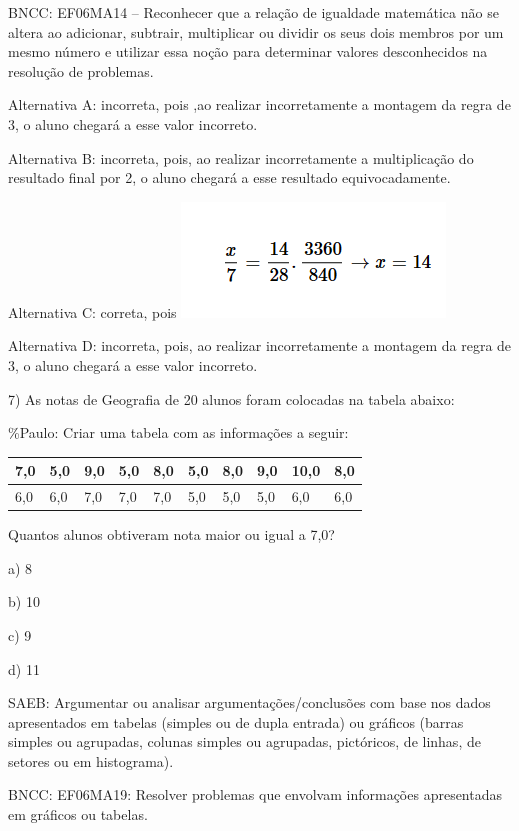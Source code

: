 BNCC: EF06MA14 -- Reconhecer que a relação de igualdade matemática não
se altera ao adicionar, subtrair, multiplicar ou dividir os seus dois
membros por um mesmo número e utilizar essa noção para determinar
valores desconhecidos na resolução de problemas.

Alternativa A: incorreta, pois ,ao realizar incorretamente a montagem da
regra de 3, o aluno chegará a esse valor incorreto.

Alternativa B: incorreta, pois, ao realizar incorretamente a
multiplicação do resultado final por 2, o aluno chegará a esse resultado
equivocadamente.

Alternativa C: correta, pois
\includegraphics[width=2.76042in,height=1.20833in]{./imgSAEB_6_MAT/media/image116.png}

Alternativa D: incorreta, pois, ao realizar incorretamente a montagem da
regra de 3, o aluno chegará a esse valor incorreto.

7) As notas de Geografia de 20 alunos foram colocadas na tabela abaixo:

\%Paulo: Criar uma tabela com as informações a seguir:

\begin{longtable}[]{@{}llllllllll@{}}
\toprule
7,0 & 5,0 & 9,0 & 5,0 & 8,0 & 5,0 & 8,0 & 9,0 & 10,0 &
8,0\tabularnewline
\midrule
\endhead
6,0 & 6,0 & 7,0 & 7,0 & 7,0 & 5,0 & 5,0 & 5,0 & 6,0 & 6,0\tabularnewline
\bottomrule
\end{longtable}

Quantos alunos obtiveram nota maior ou igual a 7,0?

a) 8

b) 10

c) 9

d) 11

SAEB: Argumentar ou analisar argumentações/conclusões com base nos dados
apresentados em tabelas (simples ou de dupla entrada) ou gráficos
(barras simples ou agrupadas, colunas simples ou agrupadas, pictóricos,
de linhas, de setores ou em histograma).

BNCC: EF06MA19: Resolver problemas que envolvam informações apresentadas
em gráficos ou tabelas.~

